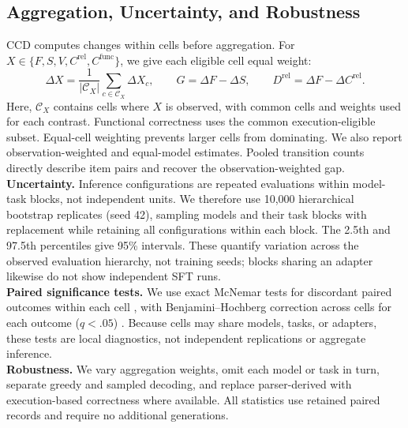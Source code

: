 \documentclass{article}
\begin{document}
\subsection{Aggregation, Uncertainty, and Robustness}
\label{sec:aggregation}
\vspace{-1mm}
CCD computes changes within cells before aggregation. For \(X\in\{F,S,V,C^{\mathrm{rel}},C^{\mathrm{func}}\}\), we give each eligible cell equal weight:
\begin{equation}
\Delta X=
\frac{1}{|\mathcal{C}_X|}
\sum_{c\in\mathcal{C}_X}\Delta X_c,
\qquad
G=\Delta F-\Delta S,
\qquad
D^{\mathrm{rel}}=\Delta F-\Delta C^{\mathrm{rel}}.
\label{eq:aggregation}
\end{equation}
Here, \(\mathcal{C}_X\) contains cells where \(X\) is observed, with common cells and weights used for each contrast. Functional correctness uses the common execution-eligible subset. Equal-cell weighting prevents larger cells from dominating. We also report observation-weighted and equal-model estimates. Pooled transition counts directly describe item pairs and recover the observation-weighted gap.
\\
\noindent\textbf{Uncertainty.}
Inference configurations are repeated evaluations within model-task blocks, not independent units. We therefore use 10,000 hierarchical bootstrap replicates (seed 42), sampling models and their task blocks with replacement while retaining all configurations within each block. The 2.5th and 97.5th percentiles give 95\% intervals. These quantify variation across the observed evaluation hierarchy, not training seeds; blocks sharing an adapter likewise do not show independent SFT runs.
\\
\noindent\textbf{Paired significance tests.}
We use exact McNemar tests for discordant paired outcomes within each cell \citep{mcnemar1947note}, with Benjamini--Hochberg correction across cells for each outcome (\(q<.05\)) \citep{benjamini1995controlling}. Because cells may share models, tasks, or adapters, these tests are local diagnostics, not independent replications or aggregate inference.
\\
\noindent\textbf{Robustness.}
We vary aggregation weights, omit each model or task in turn, separate greedy and sampled decoding, and replace parser-derived with execution-based correctness where available. All statistics use retained paired records and require no additional generations.

\vspace{-2mm}
\end{document}
